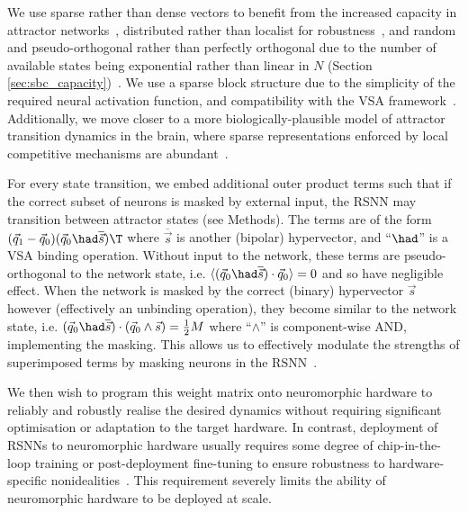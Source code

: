 We use sparse rather than dense vectors to benefit from the increased capacity in attractor networks~\cite{knoblauch_memory_2010, amari_characteristics_1989, tsodyks_enhanced_1988}, distributed rather than localist for robustness~\cite{rumelhart_parallel_1986}, and random and pseudo-orthogonal rather than perfectly orthogonal due to the number of available states being exponential rather than linear in $N$ (Section \ref{sec:sbc_capacity})~\cite{thomas_theoretical_2022}. We use a sparse block structure due to the simplicity of the required neural activation function, and compatibility with the VSA framework~\cite{frady_variable_2023}. Additionally, we move closer to a more biologically-plausible model of attractor transition dynamics in the brain, where sparse representations enforced by local competitive mechanisms are abundant~\cite{palm_neural_2013, rozell_sparse_2008}.


For every state transition, we embed additional outer product terms such that if the correct subset of neurons is masked by external input, the RSNN may transition between attractor states (see Methods).
The terms are of the form \mbox{$(\vec{q}_1 - \vec{q}_0) (\vec{q}_0 \had \overline{\vec{s}})\T$} where $\overline{\vec{s}}$ is another (bipolar) hypervector, and ``$\had$'' is a VSA binding operation. Without input to the network, these terms are pseudo-orthogonal to the network state, i.e. $\langle (\vec{q}_0 \had \overline{\vec{s}}) \cdot \vec{q}_0 \rangle = 0$ and so have negligible effect. When the network is masked by the correct (binary) hypervector $\vec{s}$ however (effectively an unbinding operation), they become similar to the network state, i.e. $ (\vec{q}_0 \had \overline{\vec{s}}) \cdot (\vec{q}_0 \land \vec{s} ) = \frac{1}{2}M$ where ``$\land$'' is component-wise $\mathrm{AND}$, implementing the masking. This allows us to effectively modulate the strengths of superimposed terms by masking neurons in the RSNN~\cite{cotteret_vector_2024}.



We then wish to program this weight matrix onto neuromorphic hardware to reliably and robustly realise the desired dynamics without requiring significant optimisation or adaptation to the target hardware. In contrast, deployment of RSNNs to neuromorphic hardware usually requires some degree of chip-in-the-loop training or post-deployment fine-tuning to ensure robustness to hardware-specific nonidealities~\cite{schmitt_neuromorphic_2017, bohnstingl_biologically-inspired_2022, cramer_surrogate_2022, neftci_device_2010, buchel_supervised_2021}. This requirement severely limits the ability of neuromorphic hardware to be deployed at scale.


